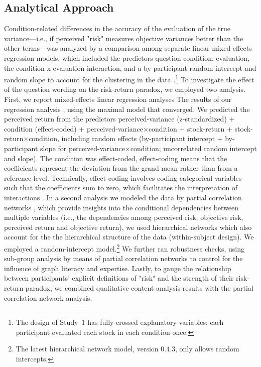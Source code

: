 \documentclass[a4paper,man, natbib,floatsintext]{apa6} %
\begin{document}
\subsection{Analytical Approach}
Condition-related differences in the accuracy of the evaluation of the true variance---i.e., if perceived "risk" measures objective variances better than the other terms---was analyzed by a comparison among separate linear mixed-effects regression models, which included the predictors question condition, evaluation, the condition x evaluation interaction, and a by-participant random intercept and random slope to account for the clustering in the data \citep[following][]{Judd2017}.\footnote{The design of Study~1 has fully-crossed explanatory variables: each participant evaluated each stock in each condition once.} To investigate the effect of the question wording on the risk-return paradox, we employed two analysis. First, we report mixed-effects linear regression analyses The results of our regression analysis \citep[following][]{Judd2017,Barr2013a}, using the maximal model that converged. We predicted the perceived return from the predictors perceived-variance (z-standardized) $+$ condition (effect-coded) $+$ perceived-variance$\times$condition $+$ stock-return $+$ stock-return$\times$condition, including random effects (by-participant intercept $+$ by-participant slope for perceived-variance$\times$condition; uncorrelated random intercept and slope). The condition was effect-coded, effect-coding means that the coefficients represent the deviation from the grand mean rather than from a reference level. Technically, effect coding involves coding categorical variables such that the coefficients sum to zero, which facilitates the interpretation of interactions \citep[e.g.,][]{SingmannForthcoming}. In a second analysis we modeled the data by partial correlation networks \citep[e.g.,][]{Epskamp2019}, which provide insights into the conditional dependencies between multiple variables (i.e., the dependencies among perceived risk, objective risk, perceived return and objective return), we used hierarchical networks which also account for the the hierarchical structure of the data (within-subject design). We employed a random-intercept model.\footnote{The latest hierarchical network model, version 0.4.3, only allows random intercepts.} We further ran robustness checks, using sub-group analysis by means of partial correlation networks to control for the influence of graph literacy and expertise. Lastly, to gauge the relationship between participants' explicit definitions of "risk" and the strength of their risk-return paradox, we combined qualitative content analysis results with the partial correlation network analysis.
\end{document}

